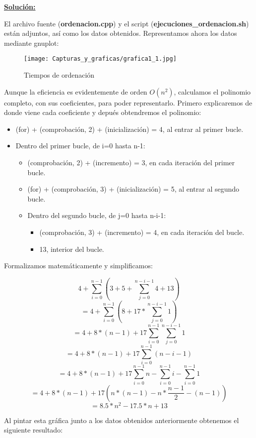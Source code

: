 \documentclass[11pt,a4paper]{article}
\begin{document}
\newpage

\textbf{\underline{Solución:}}

El archivo fuente (\textbf{ordenacion.cpp}) y el script (\textbf{ejecuciones\_ordenacion.sh}) están adjuntos, así como los datos obtenidos. Representamos ahora los datos mediante gnuplot:

\begin{figure}[H]
	\centering
	\texttt{[image: Capturas\_y\_graficas/grafica1\_1.jpg]}
	\caption{Tiempos de ordenación}
\end{figure}

Aunque la eficiencia es evidentemente de orden $O(n^2)$, calculamos el polinomio completo, con sus coeficientes, para poder representarlo. Primero explicaremos de donde viene cada coeficiente y depués obtendremos el polinomio:
\begin{itemize}
	\item (for) + (comprobación, 2) + (inicialización) = 4, al entrar al primer bucle.
	\item Dentro del primer bucle, de i=0 hasta n-1:
	\begin{itemize}
		\item (comprobación, 2) + (incremento) = 3, en cada iteración del primer bucle.
		\item (for) + (comprobación, 3) + (inicialización) = 5, al entrar al segundo bucle.
		\item Dentro del segundo bucle, de j=0 hasta n-i-1:
		\begin{itemize}
			\item (comprobación, 3) + (incremento) = 4, en cada iteración del bucle.
			\item 13, interior del bucle.
		\end{itemize}
	\end{itemize}
\end{itemize}

Formalizamos matemáticamente y simplificamos:

$$4 + \sum_{i=0}^{n-1}{(3 + 5 + \sum_{j=0}^{n-i-1}{4 + 13})} $$
$$ = 4 + \sum_{i=0}^{n-1}{(8 + 17 * \sum_{j=0}^{n-i-1}{1})} $$
$$ = 4 + 8 * (n - 1) + 17 \sum_{i=0}^{n-1}{\sum_{j=0}^{n-i-1}{1}} $$
$$ = 4 + 8 * (n - 1) + 17 \sum_{i=0}^{n-1}{(n - i - 1)} $$
$$ = 4 + 8 * (n - 1) + 17 \sum_{i=0}^{n-1}{n} - \sum_{i=0}^{n-1}{i} - \sum_{i=0}^{n-1}{1}$$
$$ = 4 + 8 * (n - 1) + 17 (n*(n - 1) - n*\frac{n-1}{2} - (n-1))$$
$$ = 8.5*n^2 - 17.5*n + 13$$

Al pintar esta gráfica junto a los datos obtenidos anteriormente obtenemos el siguiente resultado:
\end{document}

